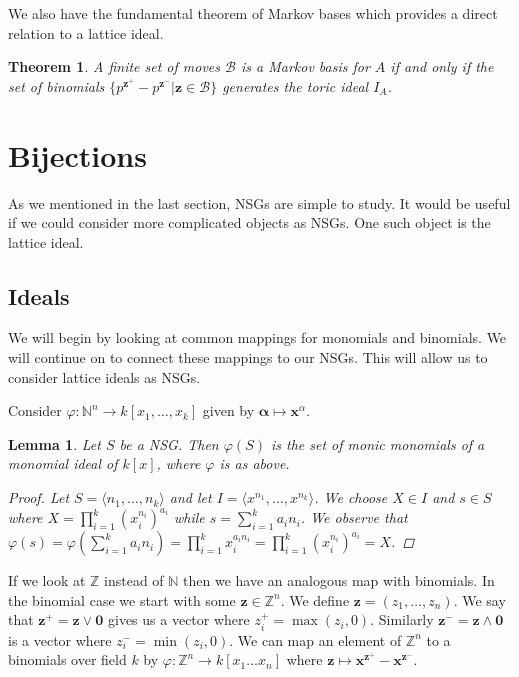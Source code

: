 \documentclass[11pt]{amsart}
\theoremstyle{plain}
\newtheorem{thm}{Theorem}
\newtheorem{lemma}{Lemma}
\theoremstyle{definition}
\begin{document}
We also have the fundamental theorem of Markov bases which provides a direct relation
to a lattice ideal.
\begin{thm}
\cite[p.~54]{aoki}
A finite set of moves $\mathcal{B}$ is a Markov basis for $A$ if and only if the set of binomials $\{p^{\mathbf{z}^+}-p^{\mathbf{z}^-}|\mathbf{z}\in \mathcal{B}\}$ generates the toric ideal $I_A$.
\end{thm}

\section{Bijections}
As we mentioned in the last section, NSGs are simple to study.
It would be useful if we could consider more complicated objects as NSGs.
One such object is the lattice ideal.
\subsection{Ideals}
We will begin by looking at common mappings for monomials and binomials. We will continue on to connect these mappings to our NSGs. This will allow us to consider lattice ideals as NSGs.

Consider
$\varphi:\mathbb{N}^n\to k[x_1,\dots,x_k]$ given by $\mathbf{\alpha}\mapsto
\mathbf{x}^\alpha$.

\begin{lemma}
Let $S$ be a NSG.  Then $\varphi(S)$ is the set of monic
monomials of a monomial ideal of $k[x]$, where $\varphi$ is as above.
\begin{proof}
  Let $S=\langle n_1,\dots,n_k\rangle$ and let $I=\langle x^{n_1},\dots,x^{n_k}\rangle$.
  We choose $X\in I$ and $s\in S$ where
  $X=\prod\limits_{i=1}^k{\left(x_i^{n_i}\right)^{a_i}}$ while
  $s=\sum\limits_{i=1}^k{a_in_i}$.
  We observe that $\varphi(s)=\varphi(\sum\limits_{i=1}^k{a_in_i})=\prod\limits_{i=1}^k{x_i^{a_in_i}}=\prod\limits_{i=1}^k{\left(x_i^{n_i}\right)^{a_i}}=X$.
\end{proof}
\end{lemma}

If we look at $\mathbb{Z}$ instead of $\mathbb{N}$ then we have an analogous map with binomials. In the binomial case we start with some $\mathbf{z}\in \mathbb{Z}^n$.
We define $\mathbf{z}=(z_1,\dots,z_n)$.
We say that $\mathbf{z}^+=\mathbf{z}\vee\mathbf{0}$
gives us a vector where $z_i^+=\max(z_i,0)$. Similarly
$\mathbf{z^-}=\mathbf{z}\wedge \mathbf{0}$ is a vector where $z_i^-=\min(z_i,0)$.
We can map an element of $\mathbb{Z}^n$ to a binomials over field $k$ by $\varphi:\mathbb{Z}^n\to k[x_1\dots x_n]$ where $\mathbf{z}\mapsto
\mathbf{x}^{\mathbf{z}^+}-\mathbf{x}^{\mathbf{z}^-}$.
\end{document}
